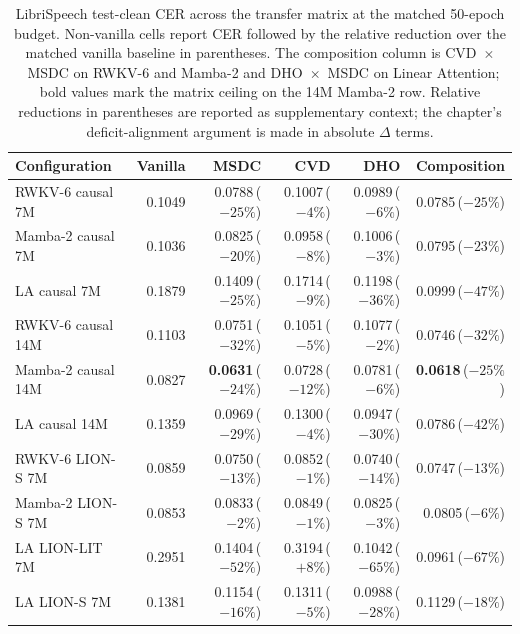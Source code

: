 \begin{table}[!htbp]
\centering
\small
\caption[Aggregated LibriSpeech test CER]{LibriSpeech test-clean
CER across the transfer matrix at the matched 50-epoch budget.
Non-vanilla cells report CER followed by the relative reduction
over the matched vanilla baseline in parentheses. The composition
column is CVD~$\times$~MSDC on RWKV-6 and Mamba-2 and
DHO~$\times$~MSDC on Linear Attention; bold values mark the matrix
ceiling on the 14M Mamba-2 row. Relative reductions in
parentheses are reported as supplementary context; the chapter's
deficit-alignment argument is made in absolute $\Delta$ terms.}
\label{tab:results:aggregated}
\setlength{\tabcolsep}{3pt}
\renewcommand{\arraystretch}{1.20}
\begin{tabularx}{\linewidth}{@{}p{3.3cm} r r r r r@{}}
\toprule
\textbf{Configuration} &
\textbf{Vanilla} & \textbf{MSDC} & \textbf{CVD} &
\textbf{DHO} & \textbf{Composition} \\
\midrule
RWKV-6 causal 7M       & 0.1049 & 0.0788{\scriptsize\,($-25\%$)} & 0.1007{\scriptsize\,($-4\%$)} & 0.0989{\scriptsize\,($-6\%$)} & 0.0785{\scriptsize\,($-25\%$)} \\
Mamba-2 causal 7M      & 0.1036 & 0.0825{\scriptsize\,($-20\%$)} & 0.0958{\scriptsize\,($-8\%$)} & 0.1006{\scriptsize\,($-3\%$)} & 0.0795{\scriptsize\,($-23\%$)} \\
LA causal 7M           & 0.1879 & 0.1409{\scriptsize\,($-25\%$)} & 0.1714{\scriptsize\,($-9\%$)} & 0.1198{\scriptsize\,($-36\%$)} & 0.0999{\scriptsize\,($-47\%$)} \\
\addlinespace
RWKV-6 causal 14M      & 0.1103 & 0.0751{\scriptsize\,($-32\%$)} & 0.1051{\scriptsize\,($-5\%$)} & 0.1077{\scriptsize\,($-2\%$)} & 0.0746{\scriptsize\,($-32\%$)} \\
Mamba-2 causal 14M     & 0.0827 & \textbf{0.0631}{\scriptsize\,($-24\%$)} & 0.0728{\scriptsize\,($-12\%$)} & 0.0781{\scriptsize\,($-6\%$)} & \textbf{0.0618}{\scriptsize\,($-25\%$)} \\
LA causal 14M          & 0.1359 & 0.0969{\scriptsize\,($-29\%$)} & 0.1300{\scriptsize\,($-4\%$)} & 0.0947{\scriptsize\,($-30\%$)} & 0.0786{\scriptsize\,($-42\%$)} \\
\addlinespace
RWKV-6 LION-S 7M       & 0.0859 & 0.0750{\scriptsize\,($-13\%$)} & 0.0852{\scriptsize\,($-1\%$)} & 0.0740{\scriptsize\,($-14\%$)} & 0.0747{\scriptsize\,($-13\%$)} \\
Mamba-2 LION-S 7M      & 0.0853 & 0.0833{\scriptsize\,($-2\%$)} & 0.0849{\scriptsize\,($-1\%$)} & 0.0825{\scriptsize\,($-3\%$)} & 0.0805{\scriptsize\,($-6\%$)} \\
LA LION-LIT 7M         & 0.2951 & 0.1404{\scriptsize\,($-52\%$)} & 0.3194{\scriptsize\,($+8\%$)} & 0.1042{\scriptsize\,($-65\%$)} & 0.0961{\scriptsize\,($-67\%$)} \\
LA LION-S 7M           & 0.1381 & 0.1154{\scriptsize\,($-16\%$)} & 0.1311{\scriptsize\,($-5\%$)} & 0.0988{\scriptsize\,($-28\%$)} & 0.1129{\scriptsize\,($-18\%$)} \\
\bottomrule
\end{tabularx}
\end{table}

